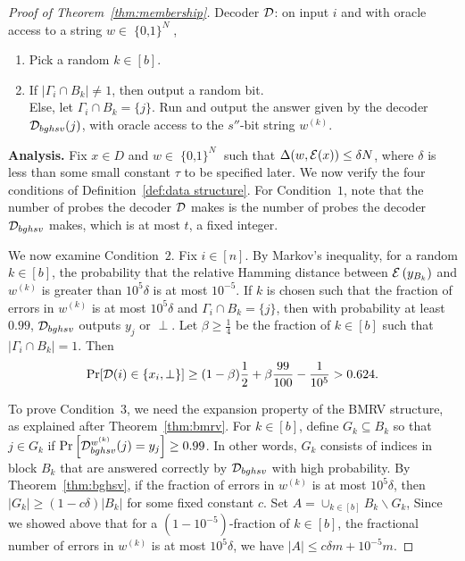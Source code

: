\documentclass[11pt,english]{article}
\theoremstyle{definition}
\theoremstyle{remark}
\newcommand{\D}{{\cal D}}
\newcommand{\E}{{\cal E}}
\newcommand{\cube}{\operatorname{\{0, 1\}}}
\begin{document}
\begin{proof}[Proof of Theorem~\ref{thm:membership}]
Decoder $\D$: on input $i$ and with oracle access to a string $w\in\cube^{N}$, 
\begin{enumerate}
\item Pick a random $k\in[b]$. 
\item If $|\Gamma_{i}\cap B_{k}|\neq1$, then output a random bit. \\
 Else, let $\Gamma_{i}\cap B_{k}=\{j\}$. Run and output the answer
given by the decoder $\D_{bghsv}(j)$, with oracle access to the $s''$-bit
string $w^{(k)}$. 
\end{enumerate}
\textbf{Analysis.} Fix $x\in{D}$ and $w\in\cube^{N}$ such that $\Delta(w,\E(x))\leq\delta N$,
where $\delta$ is less than some small constant $\tau$ to be specified later.
We now verify the four conditions of Definition~\ref{def:data structure}.
For Condition~$1$, note that the number of probes the decoder $\D$
makes is the number of probes the decoder $\D_{bghsv}$ makes, which
is at most $t$, a fixed integer.

We now examine Condition~$2$. Fix $i\in[n]$. By Markov's inequality,
for a random $k\in[b]$, the probability that the relative Hamming
distance between $\E\left(y_{B_{k}}\right)$ and $w^{(k)}$ is greater
than $10^{5}\delta$ is at most $10^{-5}$. If $k$ is chosen such
that the fraction of errors in $w^{(k)}$ is at most $10^{5}\delta$
and $\Gamma_{i}\cap B_{k}=\{j\}$, then with probability at least
$0.99$, $\D_{bghsv}$ outputs $y_{j}$ or $\perp$. Let $\beta\geq\frac{1}{4}$
be the fraction of $k\in[b]$ such that $|\Gamma_{i}\cap B_{k}|=1$.
Then \begin{equation}
\Pr[\D(i)\in\{x_{i},\perp\}]\geq(1-\beta)\frac{1}{2}+\beta\frac{99}{100}-\frac{1}{10^{5}}>0.624.\label{eq:cond2}\end{equation}

To prove Condition~$3$, we need the expansion property of the BMRV
structure, as explained after Theorem~\ref{thm:bmrv}. 
For $k\in[b]$, define $G_{k}\subseteq B_{k}$ so that
$j\in G_{k}$ if $\Pr\left[\D_{bghsv}^{w^{(k)}}(j)=y_{j}\right]\geq0.99$.
In other words, $G_{k}$ consists of indices in block $B_{k}$ that
are answered correctly by $\D_{bghsv}$ with high probability. By Theorem~\ref{thm:bghsv},
if the fraction of errors in $w^{(k)}$ is at most $10^{5}\delta$,
then $|G_{k}|\geq(1-c\delta)|B_{k}|$ for some fixed constant
$c$. Set $A=\cup_{k\in[b]}B_{k}\backslash G_{k}$, Since we showed
above that for a $(1-10^{-5})$-fraction of $k\in[b]$, the fractional
number of errors in $w^{(k)}$ is at most $10^{5}\delta$, we have
$|A|\leq c\delta m+10^{-5}m$.


\end{proof}
\end{document}

